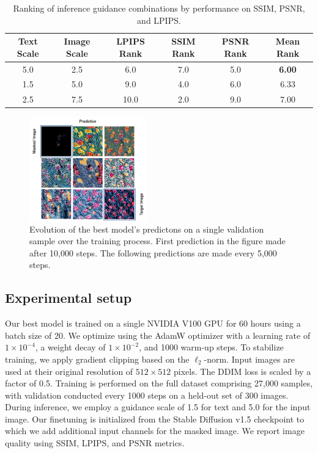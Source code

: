 \documentclass[11pt,twocolumn]{article}
\begin{document}
\begin{table}[t]
  \centering
  \begin{tabular}{cc|cccc}
    \toprule
    \textbf{Text Scale} & \textbf{Image Scale} & \textbf{LPIPS Rank} & \textbf{SSIM Rank} & \textbf{PSNR Rank}  & \textbf{Mean Rank} \\
    \midrule
    5.0 & 2.5 & 6.0 & 7.0 & 5.0  & \textbf{6.00} \\
    1.5 & 5.0 & 9.0 & 4.0 & 6.0 & 6.33 \\
    2.5 & 7.5 & 10.0 & 2.0 & 9.0 & 7.00 \\
    \bottomrule
  \end{tabular}
  \caption{Ranking of inference guidance combinations by performance on SSIM, PSNR, and LPIPS.}
  \label{tab:guidance-ranking}
\end{table}

\begin{figure}[t]
  \centering
  \includegraphics[width=0.45\textwidth]{figures/pbr_test_overview.png}
  \caption{Evolution of the best model's predictons on a single validation sample over the training process. First prediction in the figure made after 10,000 steps. The following predictions are made every 5,000 steps.}
  \label{fig:test-overview}
\end{figure}

\subsection{Experimental setup}
Our best model is trained on a single NVIDIA V100 GPU for 60 hours using a batch size of 20. We optimize using the AdamW optimizer with a learning rate of \(1 \times 10^{-4}\), a weight decay of \(1 \times 10^{-2}\), and 1000 warm-up steps. 
To stabilize training, we apply gradient clipping based on the \(\ell_2\)-norm. Input images are used at their original 
resolution of \(512 \times 512\) pixels. The DDIM loss is scaled by a factor of 0.5. 
Training is performed on the full dataset comprising 27{,}000 samples, 
with validation conducted every 1000 steps on a held-out set of 300 images. 
During inference, we employ a guidance scale of 1.5 for text and 5.0 for the input image. 
Our finetuning is initialized from the Stable Diffusion v1.5 checkpoint \cite{sd} to which we add additional input channels
for the masked image. We report image quality using SSIM, LPIPS, and PSNR metrics.
\end{document}
